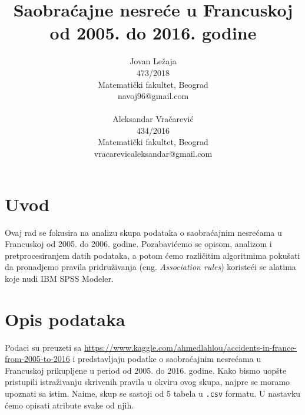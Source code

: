 \documentclass[a4paper,10pt]{article}
\title{Saobraćajne nesreće u Francuskoj od 2005. do 2016. godine}
\author{Jovan Ležaja \\ 
	473/2018 \\
	Matematički fakultet, Beograd \\
	navoj96@gmail.com \\
	\\
	Aleksandar Vračarević \\
	434/2016 \\
	Matematički fakultet, Beograd \\
	vracarevicaleksandar@gmail.com}
\begin{document}
\maketitle

\section{Uvod}
Ovaj rad se fokusira na analizu skupa podataka o saobraćajnim nesrećama u Francuskoj od 2005. do 2006. godine. Pozabavićemo se opisom, 
analizom i pretprocesiranjem datih podataka, a potom ćemo različitim algoritmima pokušati da pronadjemo pravila pridruživanja 
(eng. \textit{Association rules}) koristeći se alatima koje nudi IBM SPSS Modeler.

\section{Opis podataka}

Podaci su preuzeti sa \href{https://www.kaggle.com/ahmedlahlou/accidents-in-france-from-2005-to-2016}{https://www.kaggle.com/ahmedlahlou/accidents-in-france-from-2005-to-2016}
i predstavljaju podatke o saobraćajnim nesrećama u Francuskoj prikupljene u period od 2005. do 2016. godine. Kako bismo uopšte pristupili istraživanju skrivenih pravila u okviru ovog skupa, najpre se moramo upoznati sa istim. Naime, skup se sastoji od 5 tabela u \texttt{.csv} formatu. U nastavku ćemo opisati atribute svake od njih. \\
\end{document}
